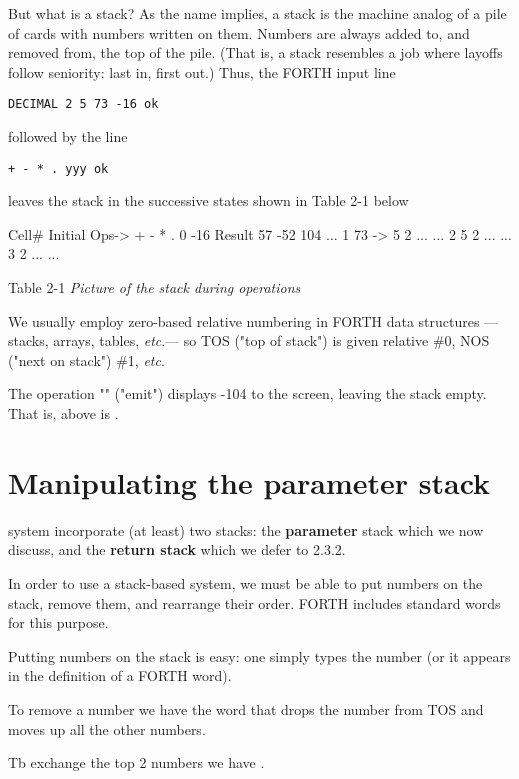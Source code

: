 But what is a stack? As the name implies, a stack is the machine analog of a pile of cards with numbers written on them. Numbers are always added to, and removed from, the top of the pile. (That is, a stack resembles a job where layoffs follow seniority: last in, first out.) Thus, the FORTH input line

\begin{lstlisting}
DECIMAL 2 5 73 -16 ok
\end{lstlisting}

followed by the line

\begin{lstlisting}
+ - * . yyy ok
\end{lstlisting}

leaves the stack in the successive states shown in Table 2-1 below 

Cell\# 	Initial 	Ops-> 	+ 	-	*	.
0 		-16 		Result 	57 	-52	104	...
1 		73 		-> 		5 	2	...	...
2 		5 		2		...	...
3 		2		...		...

 Table 2-1 \textit{Picture of the stack during operations}

We usually employ zero-based relative numbering in FORTH data structures —stacks, arrays, tables, \textit{etc}.— so TOS ("top of stack") is given relative \#0, NOS ("next on stack") \#1, \textit{\textit{etc}}.

The operation "" ("emit") displays -104 to the screen, leaving the stack empty. That is,  above is .

\section{Manipulating the parameter stack}

 system incorporate (at least) two stacks: the \textbf{parameter} stack which we now discuss, and the \textbf{return stack} which we defer to 2.3.2.

In order to use a stack-based system, we must be able to put numbers on the stack, remove them, and rearrange their order. FORTH includes standard words for this purpose.

Putting numbers on the stack is easy: one simply types the number (or it appears in the definition of a FORTH word).

To remove a number we have the word  that drops the number from TOS and moves up all the other numbers.

Tb exchange the top 2 numbers we have .

